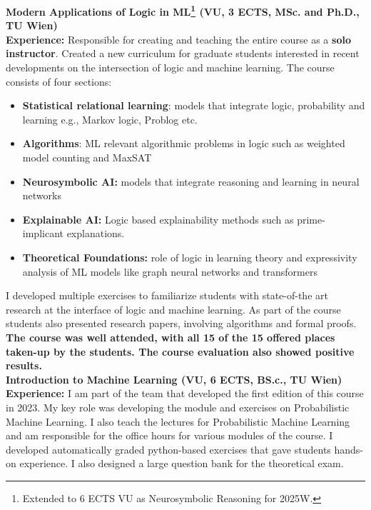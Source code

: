 \documentclass[10pt, a4paper]{article}
\newcommand{\years}[1]{\marginnote{\scriptsize #1}}
\begin{document}
\years{2025S - Now} \textbf{Modern Applications of Logic in ML\footnote{Extended to 6 ECTS VU as Neurosymbolic Reasoning for 2025W.}  
(VU, 3 ECTS, MSc. and Ph.D., TU Wien)\\ 
}
\textbf{Experience:}  Responsible for creating and teaching the entire course as a \textbf{solo instructor}. Created a new curriculum for graduate students interested in recent developments on the intersection of logic and machine learning. The course consists of four sections:
\begin{itemize}
    \item \textbf{Statistical relational learning}: models that integrate logic, probability and learning e.g., Markov logic, Problog etc. 
    \item \textbf{Algorithms}: ML relevant algorithmic problems in logic such as weighted model counting and MaxSAT 
    \item \textbf{Neurosymbolic AI:} models that integrate reasoning and learning in neural networks
    \item \textbf{Explainable AI:} Logic based explainability methods such as prime-implicant explanations.
    \item \textbf{Theoretical Foundations:} role of logic in learning theory and expressivity analysis of ML models like graph neural networks and transformers
\end{itemize}
I developed multiple exercises to familiarize students with state-of-the art research at the interface of logic and machine learning. As part of the course students also presented research papers, involving algorithms and formal proofs.
\textbf{The course was well attended, with all 15 of the 15 offered places taken-up by the students. The course evaluation also showed positive results.}\\


\years{2023W - Now} \textbf{Introduction to Machine Learning (VU, 6 ECTS, BS.c., TU Wien)}\\
\textbf{Experience:} I am part of the team that developed the first edition of this course in 2023. My key role was developing the module and exercises on Probabilistic Machine Learning. I also teach the lectures for Probabilistic Machine Learning and am responsible for the office hours for various modules of the course. I developed automatically graded python-based exercises that gave students hands-on experience. I also designed a large question bank for the theoretical exam. \\
\end{document}
